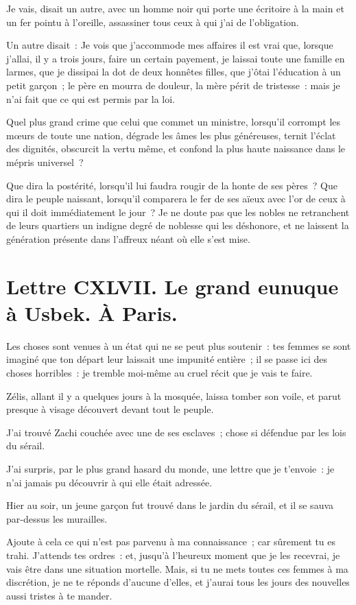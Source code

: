 \documentclass[french,twoside]{book} %
\newcommand{\dateline}[1]{\medskip{\RaggedLeft{#1}\par}\bigskip}
\begin{document}
Je vais, disait un autre, avec un homme noir qui porte une écritoire à la main et un fer pointu à l’oreille, assassiner tous ceux à qui j’ai de l’obligation.\par
Un autre disait : Je vois que j’accommode mes affaires il est vrai que, lorsque j’allai, il y a trois jours, faire un certain payement, je laissai toute une famille en larmes, que je dissipai la dot de deux honnêtes filles, que j’ôtai l’éducation à un petit garçon ; le père en mourra de douleur, la mère périt de tristesse : mais je n’ai fait que ce qui est permis par la loi.\par
Quel plus grand crime que celui que commet un ministre, lorsqu’il corrompt les mœurs de toute une nation, dégrade les âmes les plus généreuses, ternit l’éclat des dignités, obscurcit la vertu même, et confond la plus haute naissance dans le mépris universel ?\par
Que dira la postérité, lorsqu’il lui faudra rougir de la honte de ses pères ? Que dira le peuple naissant, lorsqu’il comparera le fer de ses aïeux avec l’or de ceux à qui il doit immédiatement le jour ? Je ne doute pas que les nobles ne retranchent de leurs quartiers un indigne degré de noblesse qui les déshonore, et ne laissent la génération présente dans l’affreux néant où elle s’est mise.\par

\dateline{De Paris, le 11 de la lune de Rhamazan, 1720.}
\section[{Lettre CXLVII. Le grand eunuque à Usbek. À Paris.}]{Lettre CXLVII. Le grand eunuque à Usbek. À Paris.}\renewcommand{\leftmark}{Lettre CXLVII. Le grand eunuque à Usbek. À Paris.}

\noindent Les choses sont venues à un état qui ne se peut plus soutenir : tes femmes se sont imaginé que ton départ leur laissait une impunité entière ; il se passe ici des choses horribles : je tremble moi-même au cruel récit que je vais te faire.\par
Zélis, allant il y a quelques jours à la mosquée, laissa tomber son voile, et parut presque à visage découvert devant tout le peuple.\par
J’ai trouvé Zachi couchée avec une de ses esclaves ; chose si défendue par les lois du sérail.\par
J’ai surpris, par le plus grand hasard du monde, une lettre que je t’envoie : je n’ai jamais pu découvrir à qui elle était adressée.\par
Hier au soir, un jeune garçon fut trouvé dans le jardin du sérail, et il se sauva par-dessus les murailles.\par
Ajoute à cela ce qui n’est pas parvenu à ma connaissance ; car sûrement tu es trahi. J’attends tes ordres : et, jusqu’à l’heureux moment que je les recevrai, je vais être dans une situation mortelle. Mais, si tu ne mets toutes ces femmes à ma discrétion, je ne te réponds d’aucune d’elles, et j’aurai tous les jours des nouvelles aussi tristes à te mander.\par
\end{document}
